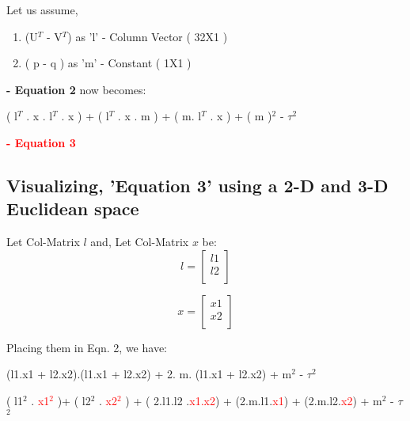 \documentclass[11 pt]{article}
\begin{document}
{\vspace{\baselineskip}

Let us assume, 
\begin{enumerate} 
\item (U$^T$ -  V$^T$) as 'l' \hspace{1.3 cm}- Column Vector ( 32X1 )
\item ( p - q ) as 'm' \hspace{1.3 cm}- Constant ( 1X1 )
\end{enumerate} 

\vspace{\baselineskip}

\textbf{- Equation 2 } now becomes:

( l$^T$ . x . l$^T$ . x ) +  ( l$^T$ . x . m )  +   ( m. l$^T$ . x )  + ( m )$^2$ - $\tau$$^2$ 
\begin{flushright} \textbf{\textcolor{red}{- Equation 3}} \end{flushright}
\vspace{\baselineskip}

\subsection{ Visualizing, 'Equation 3' using a 2-D and 3-D Euclidean space }

\newcommand{\aaa}{%
\begin{bmatrix}
    l1 \\
    l2 \\
\end{bmatrix}%
}

\vspace{\baselineskip}

Let Col-Matrix $l$ and, Let Col-Matrix $x$ be:
\[
l = \aaa
\]

\newcommand{\aab}{%
\begin{bmatrix}
    x1 \\
    x2 \\
\end{bmatrix}%
}

\[
x = \aab
\]

\vspace{\baselineskip}
Placing them in Eqn. 2, we have:
\vspace{\baselineskip}

(l1.x1 + l2.x2).(l1.x1 + l2.x2) + 2. m. (l1.x1 + l2.x2) + m$^2$ - $\tau$$^2$ 

( l1$^2$ . \textcolor{red}{x1$^2$} )+ ( l2$^2$ . \textcolor{red}{x2$^2$} ) + ( 2.l1.l2 .\textcolor{red}{x1.x2}) + (2.m.l1.\textcolor{red}{x1}) + (2.m.l2.\textcolor{red}{x2}) + m$^2$ - $\tau$$^2$ 

}
\end{document}
